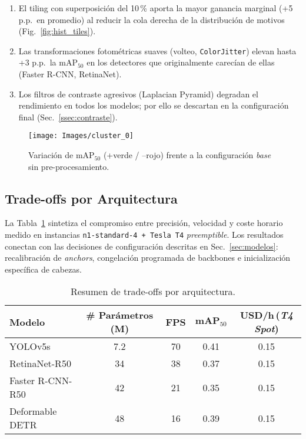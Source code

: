 \begin{enumerate}
  \item El tiling con superposición del 10\,\% aporta la mayor ganancia marginal (+5 p.p.\ en promedio) al reducir la cola derecha de la distribución de motivos (Fig.~\ref{fig:hist_tiles}).
  \item Las transformaciones fotométricas suaves (volteo, \texttt{ColorJitter}) elevan hasta +3 p.p.\ la \(\text{mAP}_{50}\) en los detectores que originalmente carecían de ellas (Faster R-CNN, RetinaNet).
  \item Los filtros de contraste agresivos (Laplacian Pyramid) degradan el rendimiento en todos los modelos; por ello se descartan en la configuración final (Sec.~\ref{ssec:contraste}).
\end{enumerate}

\begin{figure}[ht]
  \centering
  \texttt{[image: Images/cluster\_0]}
  \caption{Variación de \(\text{mAP}_{50}\) (+verde / –rojo) frente a la configuración \emph{base} sin pre-procesamiento.}
  \label{fig:heatmap_pp}
\end{figure}

\subsection{Trade-offs por Arquitectura}

La Tabla~\ref{tab:tradeoff} sintetiza el compromiso entre precisión, velocidad y coste horario medido en instancias \texttt{n1-standard-4 + Tesla T4} \emph{preemptible}.
Los resultados conectan con las decisiones de configuración descritas en Sec.~\ref{sec:modelos}: recalibración de \emph{anchors}, congelación programada de backbones e inicialización específica de cabezas.

\begin{table}[ht]
\centering
\caption{Resumen de trade-offs por arquitectura.}
\label{tab:tradeoff}
\begin{tabular}{|l|c|c|c|c|}
\hline
\textbf{Modelo} & \textbf{\# Parámetros (M)} & \textbf{FPS} & \(\textbf{mAP}_{50}\) & \textbf{USD/h}\footnotesize{\,(\textit{T4 Spot})} \\ \hline
YOLOv5s          & 7.2  & 70 & 0.41 & 0.15 \\ \hline
RetinaNet-R50    & 34   & 38 & 0.37 & 0.15 \\ \hline
Faster R-CNN-R50 & 42   & 21 & 0.35 & 0.15 \\ \hline
Deformable DETR  & 48   & 16 & 0.39 & 0.15 \\ \hline
\end{tabular}
\end{table}

